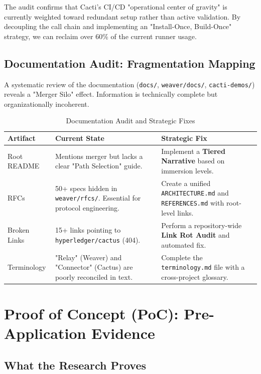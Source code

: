The audit confirms that Cacti's CI/CD "operational center of gravity" is currently weighted toward redundant setup rather than active validation. By decoupling the call chain and implementing an "Install-Once, Build-Once" strategy, we can reclaim over 60\% of the current runner usage.

\subsection{Documentation Audit: Fragmentation Mapping}

A systematic review of the documentation (\texttt{docs/}, \texttt{weaver/docs/}, \texttt{cacti-demos/}) reveals a "Merger Silo" effect. Information is technically complete but organizationally incoherent.

\begin{table}[h]
\centering
\begin{tabularx}{\textwidth}{l X X}
\toprule
\textbf{\color{primary} Artifact} & \textbf{\color{primary} Current State} & \textbf{\color{primary} Strategic Fix} \\
\midrule
Root README & Mentions merger but lacks a clear "Path Selection" guide. & Implement a \textbf{Tiered Narrative} based on immersion levels. \\
\addlinespace
RFCs & 50+ specs hidden in \texttt{weaver/rfcs/}. Essential for protocol engineering. & Create a unified \texttt{ARCHITECTURE.md} and \texttt{REFERENCES.md} with root-level links. \\
\addlinespace
Broken Links & 15+ links pointing to \texttt{hyperledger/cactus} (404). & Perform a repository-wide \textbf{Link Rot Audit} and automated fix. \\
\addlinespace
Terminology & "Relay" (Weaver) and "Connector" (Cactus) are poorly reconciled in text. & Complete the \texttt{terminology.md} file with a cross-project glossary. \\
\bottomrule
\end{tabularx}
\caption{Documentation Audit and Strategic Fixes}
\label{tab:doc-audit}
\end{table}

\section{Proof of Concept (PoC): Pre-Application Evidence}

\subsection{What the Research Proves}

